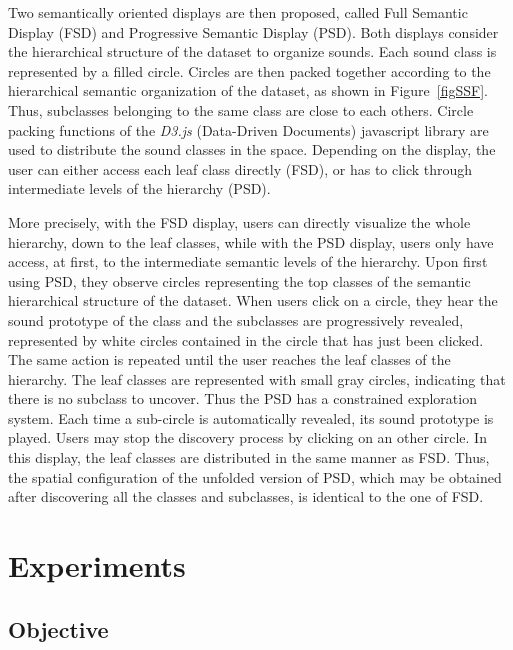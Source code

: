 \documentclass{aes2e}
\newcommand{\mr}[1]{\textcolor{green}{Mathias : #1}}
\begin{document}
Two semantically oriented displays are then proposed, called Full Semantic Display (FSD) and Progressive Semantic Display (PSD). Both displays consider the hierarchical structure of the dataset to organize sounds. Each sound class is represented by a filled circle. Circles are then packed together according to the hierarchical semantic organization of the dataset, as shown in Figure~\ref{figSSF}. Thus, subclasses belonging to the same class are close to each others. Circle packing functions of the \emph{D3.js} (Data-Driven Documents) javascript library \cite{2011-d3} are used to distribute the sound classes in the space. Depending on the display, the user can either access each leaf class directly (FSD), or has to click through intermediate levels of the hierarchy (PSD). 

More precisely, with the FSD display, users can directly visualize the whole hierarchy, down to the leaf classes, while with the PSD display, users only have access, at first, to the intermediate semantic levels of the hierarchy. Upon first using PSD, they observe circles representing the top classes of the semantic hierarchical structure of the dataset. When users click on a circle, they hear the sound prototype of the class and the subclasses are progressively revealed, represented by white circles contained in the circle that has just been clicked. The same action is repeated until the user reaches the leaf classes of the hierarchy. The leaf classes are represented with small gray circles, indicating that there is no subclass to uncover. Thus the PSD has a constrained exploration system. Each time a sub-circle is automatically revealed, its sound prototype is played. Users may stop the discovery process by clicking on an other circle. In this display, the leaf classes are distributed  in the same manner as FSD. Thus, the spatial configuration of the unfolded version of PSD, which may be obtained after discovering all the classes and subclasses, is identical to the one of FSD.


\section{Experiments} \label{test}

\subsection{Objective}
\end{document}

